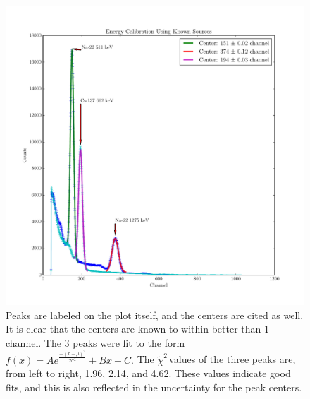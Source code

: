 \documentclass{article}
\newcommand{\redchi}{$\tilde{\chi}^2\,$}
\begin{document}
  \begin{figure}[!htb]
    \centering
    \includegraphics[scale=.5]{../plots/calibration_peaks.pdf}
    \caption{Peaks are labeled on the plot itself, and the centers are cited as well.  It is clear that the centers are known to within better than 1 channel.  The 3 peaks were fit to the form $f(x) = Ae^{\frac{-(x-\mu)^2}{2\sigma^2}} + Bx + C.$ The \redchi values of the three peaks are, from left to right, 1.96, 2.14, and 4.62.  These values indicate good fits, and this is also reflected in the uncertainty for the peak centers.}
    \label{cal_peaks}
  \end{figure}
\end{document}
